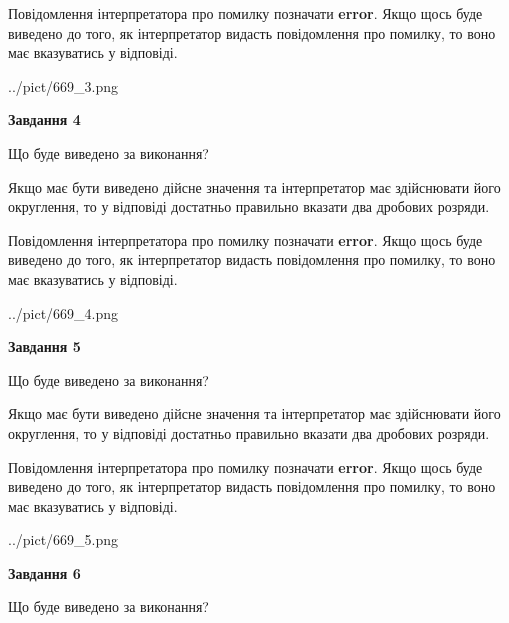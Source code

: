 \documentclass[12pt, ukrainian]{article}
\begin{document}
{\begin {Large}
Повідомлення інтерпретатора про помилку позначати \textbf{error}.
Якщо щось буде виведено до того, як інтерпретатор видасть повідомлення про помилку, 
то воно має вказуватись у відповіді. \par

\begin{center}
	{../pict/669_3.png}
\end{center}
\newpage

{\begin {center}\textbf{Завдання 4}\end {center}}\par
Що буде виведено за виконання? \par

Якщо має бути виведено дійсне значення та інтерпретатор має здійснювати його округлення, 
то у відповіді достатньо правильно вказати два дробових розряди.

Повідомлення інтерпретатора про помилку позначати \textbf{error}.
Якщо щось буде виведено до того, як інтерпретатор видасть повідомлення про помилку, 
то воно має вказуватись у відповіді. \par

\begin{center}
	{../pict/669_4.png}
\end{center}
\newpage

{\begin {center}\textbf{Завдання 5}\end {center}}\par
Що буде виведено за виконання? \par

Якщо має бути виведено дійсне значення та інтерпретатор має здійснювати його округлення, 
то у відповіді достатньо правильно вказати два дробових розряди.

Повідомлення інтерпретатора про помилку позначати \textbf{error}.
Якщо щось буде виведено до того, як інтерпретатор видасть повідомлення про помилку, 
то воно має вказуватись у відповіді. \par

\begin{center}
	{../pict/669_5.png}
\end{center}
\newpage

{\begin {center}\textbf{Завдання 6}\end {center}}\par
Що буде виведено за виконання? \par


\end{Large}}
\end{document}
